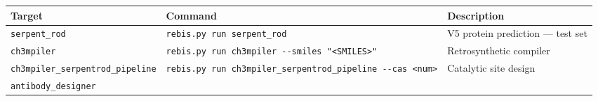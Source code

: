 \documentclass[12pt,a4paper]{article}
\begin{document}
\begin{longtable}[]{@{}lll@{}}
\toprule
\begin{minipage}[b]{0.24\columnwidth}\raggedright
Target\strut
\end{minipage} & \begin{minipage}[b]{0.27\columnwidth}\raggedright
Command\strut
\end{minipage} & \begin{minipage}[b]{0.40\columnwidth}\raggedright
Description\strut
\end{minipage}\tabularnewline
\midrule
\endhead
\begin{minipage}[t]{0.24\columnwidth}\raggedright
\texttt{serpent\_rod}\strut
\end{minipage} & \begin{minipage}[t]{0.27\columnwidth}\raggedright
\texttt{rebis.py\ run\ serpent\_rod}\strut
\end{minipage} & \begin{minipage}[t]{0.40\columnwidth}\raggedright
V5 protein prediction --- test set\strut
\end{minipage}\tabularnewline
\begin{minipage}[t]{0.24\columnwidth}\raggedright
\texttt{ch3mpiler}\strut
\end{minipage} & \begin{minipage}[t]{0.27\columnwidth}\raggedright
\texttt{rebis.py\ run\ ch3mpiler\ -\/-smiles\ "\textless{}SMILES\textgreater{}"}\strut
\end{minipage} & \begin{minipage}[t]{0.40\columnwidth}\raggedright
Retrosynthetic compiler\strut
\end{minipage}\tabularnewline
\begin{minipage}[t]{0.24\columnwidth}\raggedright
\texttt{ch3mpiler\_serpentrod\_pipeline}\strut
\end{minipage} & \begin{minipage}[t]{0.27\columnwidth}\raggedright
\texttt{rebis.py\ run\ ch3mpiler\_serpentrod\_pipeline\ -\/-cas\ \textless{}num\textgreater{}}\strut
\end{minipage} & \begin{minipage}[t]{0.40\columnwidth}\raggedright
Catalytic site design\strut
\end{minipage}\tabularnewline
\begin{minipage}[t]{0.24\columnwidth}\raggedright
\texttt{antibody\_designer}\strut
\end{minipage} & \begin{minipage}[t]{0.27\columnwidth}\raggedright

\end{minipage}
\end{longtable}
\end{document}
